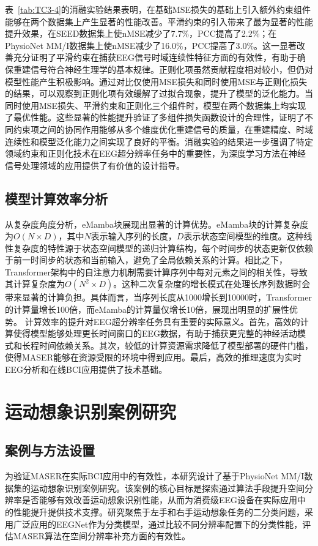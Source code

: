表~\ref{tab:TC3-4}的消融实验结果表明，在基础MSE损失的基础上引入额外约束组件能够在两个数据集上产生显著的性能改善。平滑约束的引入带来了最为显著的性能提升效果，在SEED数据集上使nMSE减少了7.7\%，PCC提高了2.2\%；在PhysioNet MM/I数据集上使nMSE减少了16.0\%，PCC提高了3.0\%。这一显著改善充分证明了平滑约束在捕获EEG信号时域连续性特征方面的有效性，有助于确保重建信号符合神经生理学的基本规律。正则化项虽然贡献程度相对较小，但仍对模型性能产生积极影响。通过对比仅使用MSE损失和同时使用MSE与正则化损失的结果，可以观察到正则化项有效缓解了过拟合现象，提升了模型的泛化能力。当同时使用MSE损失、平滑约束和正则化三个组件时，模型在两个数据集上均实现了最优性能。这些显著的性能提升验证了多组件损失函数设计的合理性，证明了不同约束项之间的协同作用能够从多个维度优化重建信号的质量，在重建精度、时域连续性和模型泛化能力之间实现了良好的平衡。消融实验的结果进一步强调了特定领域约束和正则化技术在EEG超分辨率任务中的重要性，为深度学习方法在神经信号处理领域的应用提供了有价值的设计指导。

\subsection{模型计算效率分析}
从复杂度角度分析，eMamba块展现出显著的计算优势。eMamba块的计算复杂度为$O(N \times D)$，其中$N$表示输入序列的长度，$D$表示状态空间模型的维度。这种线性复杂度的特性源于状态空间模型的递归计算结构，每个时间步的状态更新仅依赖于前一时间步的状态和当前输入，避免了全局依赖关系的计算。相比之下，Transformer架构中的自注意力机制需要计算序列中每对元素之间的相关性，导致其计算复杂度为$O(N^2 \times D)$。这种二次复杂度的增长模式在处理长序列数据时会带来显著的计算负担。具体而言，当序列长度从1000增长到10000时，Transformer的计算量增长100倍，而eMamba的计算量仅增长10倍，展现出明显的扩展性优势。
计算效率的提升对EEG超分辨率任务具有重要的实际意义。首先，高效的计算使得模型能够处理更长时间窗口的EEG数据，有助于捕获更完整的神经活动模式和长程时间依赖关系。其次，较低的计算资源需求降低了模型部署的硬件门槛，使得MASER能够在资源受限的环境中得到应用。最后，高效的推理速度为实时EEG分析和在线BCI应用提供了技术基础。


\section{运动想象识别案例研究}

\subsection{案例与方法设置}
为验证MASER在实际BCI应用中的有效性，本研究设计了基于PhysioNet MM/I数据集的运动想象识别案例研究。该案例的核心目标是探索通过算法手段提升空间分辨率是否能够有效改善运动想象识别性能，从而为消费级EEG设备在实际应用中的性能提升提供技术支撑。研究聚焦于左手和右手运动想象任务的二分类问题，采用广泛应用的EEGNet\cite{lawhernEEGnet2018}作为分类模型，通过比较不同分辨率配置下的分类性能，评估MASER算法在空间分辨率补充方面的有效性。

